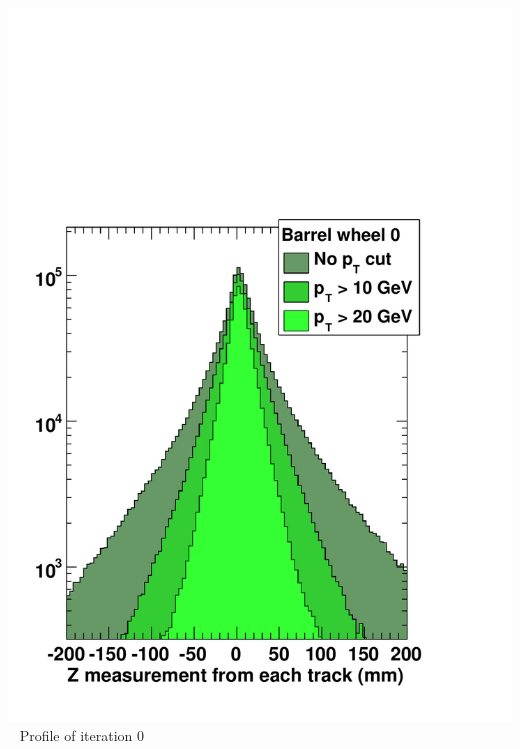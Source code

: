 \documentclass[compress]{beamer}
\begin{document}
\begin{frame}
\begin{columns}
\includegraphics[width=\linewidth]{Zparameter_wh0.pdf}
\mbox{ } \hfill Profile of iteration 0 \hfill \mbox{ }


\end{columns}
\end{frame}
\end{document}
